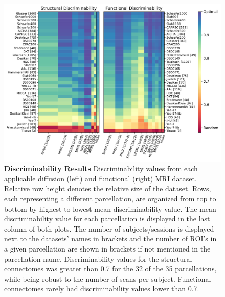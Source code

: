 \begin{figure}%
    \centering \offinterlineskip
    \includegraphics[width=1\textwidth]{figures/m2g/figure3.pdf}
    \caption[Discriminability values from each applicable diffusion (left) and functional (right) MRI dataset.]{\textbf{Discriminability Results}
    Discriminability values from each applicable diffusion (left) and functional (right) MRI dataset. Relative row height denotes the relative size of the dataset. Rows, each representing a different parcellation, are organized from top to bottom by highest to lowest mean discriminability value. The mean discriminability value for each parcellation is displayed in the last column of both plots. The number of subjects/sessions is displayed next to the datasets' names in brackets and the number of ROI's in a given parcellation are shown in brackets if not mentioned in the parcellation name. Discriminability values for the structural connectomes was greater than 0.7 for the 32 of the 35 parcellations, while being robust to the number of scans per subject. Functional connectomes rarely had discriminability values lower than 0.7.}
    \label{fig:func_discrim}
\end{figure}


